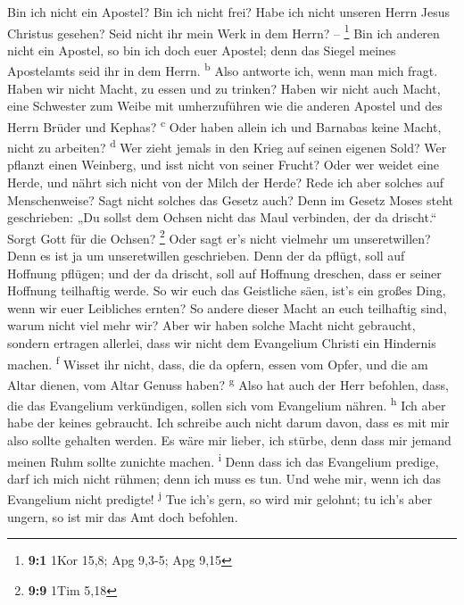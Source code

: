  Bin ich nicht ein Apostel? Bin ich nicht frei? Habe ich
nicht unseren Herrn Jesus Christus gesehen? Seid nicht ihr mein Werk in
dem Herrn? -- \footnote{\textbf{9:1} 1Kor 15,8; Apg 9,3-5; Apg 9,15}
 Bin ich anderen nicht ein Apostel, so bin ich doch euer
Apostel; denn das Siegel meines Apostelamts seid ihr in dem Herrn.
\textsuperscript{b}  Also antworte ich, wenn man mich
fragt.  Haben wir nicht Macht, zu essen und zu trinken?
 Haben wir nicht auch Macht, eine Schwester zum Weibe mit
umherzuführen wie die anderen Apostel und des Herrn Brüder und Kephas?
\textsuperscript{c}  Oder haben allein ich und Barnabas
keine Macht, nicht zu arbeiten? \textsuperscript{d}  Wer
zieht jemals in den Krieg auf seinen eigenen Sold? Wer pflanzt einen
Weinberg, und isst nicht von seiner Frucht? Oder wer weidet eine Herde,
und nährt sich nicht von der Milch der Herde?  Rede ich
aber solches auf Menschenweise? Sagt nicht solches das Gesetz auch?
 Denn im Gesetz Moses steht geschrieben: „Du sollst dem
Ochsen nicht das Maul verbinden, der da drischt.`` Sorgt Gott für die
Ochsen? \footnote{\textbf{9:9} 1Tim 5,18}  Oder sagt er's
nicht vielmehr um unseretwillen? Denn es ist ja um unseretwillen
geschrieben. Denn der da pflügt, soll auf Hoffnung pflügen; und der da
drischt, soll auf Hoffnung dreschen, dass er seiner Hoffnung teilhaftig
werde.  So wir euch das Geistliche säen, ist's ein großes
Ding, wenn wir euer Leibliches ernten?  So andere dieser
Macht an euch teilhaftig sind, warum nicht viel mehr wir? Aber wir haben
solche Macht nicht gebraucht, sondern ertragen allerlei, dass wir nicht
dem Evangelium Christi ein Hindernis machen. \textsuperscript{f}
 Wisset ihr nicht, dass, die da opfern, essen vom Opfer,
und die am Altar dienen, vom Altar Genuss haben? \textsuperscript{g}
 Also hat auch der Herr befohlen, dass, die das
Evangelium verkündigen, sollen sich vom Evangelium nähren.
\textsuperscript{h}  Ich aber habe der keines gebraucht.
Ich schreibe auch nicht darum davon, dass es mit mir also sollte
gehalten werden. Es wäre mir lieber, ich stürbe, denn dass mir jemand
meinen Ruhm sollte zunichte machen. \textsuperscript{i} 
Denn dass ich das Evangelium predige, darf ich mich nicht rühmen; denn
ich muss es tun. Und wehe mir, wenn ich das Evangelium nicht predigte!
\textsuperscript{j}  Tue ich's gern, so wird mir gelohnt;
tu ich's aber ungern, so ist mir das Amt doch befohlen.
